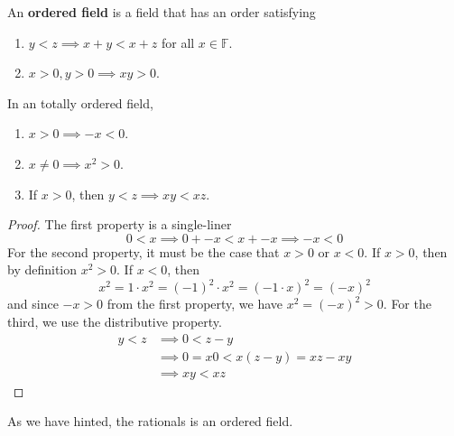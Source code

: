     \begin{definition}
      An \textbf{ordered field} is a field that has an order satisfying 
      \begin{enumerate}
        \item $y < z \implies x + y < x + z$ for all $x \in \mathbb{F}$. 
        \item $x > 0, y > 0 \implies xy > 0$. 
      \end{enumerate}
    \end{definition}

    \begin{theorem}[Properties]
      In an totally ordered field, 
      \begin{enumerate}
        \item $x > 0 \implies -x < 0$. 
        \item $x \neq 0 \implies x^2 > 0$. 
        \item If $x > 0$, then $y < z \implies xy < xz$. 
      \end{enumerate}
    \end{theorem} 
    \begin{proof}
      The first property is a single-liner 
      \begin{equation}
        0 < x \implies 0 + -x < x + -x \implies -x < 0 
      \end{equation}
      For the second property, it must be the case that $x > 0$ or $x < 0$. If $x > 0$, then by definition $x^2 > 0$. If $x < 0$, then 
      \begin{equation}
        x^2 = 1 \cdot x^2 = (-1)^2 \cdot x^2 = (-1 \cdot x)^2 = (-x)^2
      \end{equation}
      and since $-x > 0$ from the first property, we have $x^2 = (-x)^2 > 0$. For the third, we use the distributive property. 
      \begin{align}
        y < z & \implies 0 < z - y \\ 
              & \implies 0 = x 0 < x(z - y) = xz - xy \\
              & \implies xy < xz
      \end{align}
    \end{proof}

    As we have hinted, the rationals is an ordered field. 

